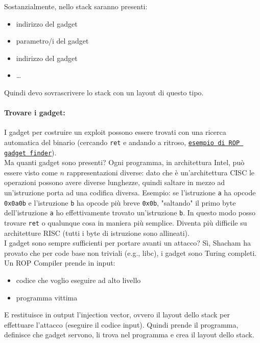 \newpage

Sostanzialmente, nello stack saranno presenti:
\begin{itemize}
	\item indirizzo del gadget
	\item parametro/i del gadget
	\item indirizzo del gadget
	\item \dots
\end{itemize} 
Quindi devo sovrascrivere lo stack con un layout di questo tipo.

\paragraph{Trovare i gadget:} I gadget per costruire un exploit possono essere trovati con una ricerca automatica del binario (cercando \texttt{ret} e andando a ritroso, \href{https://github.com/0vercl0k/rp}{\texttt{esempio di ROP gadget finder}}). \\

Ma quanti gadget sono presenti? Ogni programma, in architettura Intel, può essere visto come $n$ rappresentazioni diverse: dato che è un'architettura CISC le operazioni possono avere diverse lunghezze, quindi saltare in mezzo ad un'istruzione porta ad una codifica diversa.  Esempio: se l'istruzione \texttt{a} ha opcode \texttt{0x0a0b} e l'istruzione \texttt{b} ha opcode più breve \texttt{0x0b}, "saltando" il primo byte dell'istruzione \texttt{a} ho effettivamente trovato un'istruzione \texttt{b}. In questo modo posso trovare \texttt{ret} o qualunque cosa in maniera più semplice. Diventa più difficile su architetture RISC (tutti i byte di istruzione sono allineati).\\

I gadget sono sempre sufficienti per portare avanti un attacco? Sì, Shacham ha provato che per code base non triviali (e.g., libc), i gadget sono Turing completi.\\

Un ROP Compiler prende in input:
\begin{itemize}
	\item codice che voglio eseguire ad alto livello
	\item programma vittima
\end{itemize}

E restituisce in output l'injection vector, ovvero il layout dello stack per effettuare l'attacco (eseguire il codice input). Quindi prende il programma, definisce che gadget servono, li trova nel programma e crea il layout dello stack.

